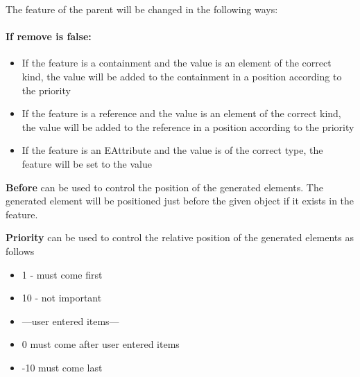 The feature of the parent will be changed in the following ways:

\paragraph{If remove is false:}
\begin{itemize}
	\item  If the feature is a containment and the value is an element of the correct kind, the value will be added to the containment in a position according to the priority
	\item  If the feature is a reference and the value is an element of the correct kind, the value will be added to the reference in a position according to the priority
	\item  If the feature is an EAttribute and the value is of the correct type, the feature will be set to the value
\end{itemize}

\textbf{Before} can be used to control the position of the generated elements. 
The generated element will be positioned just before the given object if it exists in the feature.

\textbf{Priority} can be used to control the relative position of the generated elements as follows
\begin{itemize}
	\item 1 - must come first
	\item 10 - not important
	\item ---user entered items---
	\item 0 must come after user entered items
	\item -10 must come last
\end{itemize}


